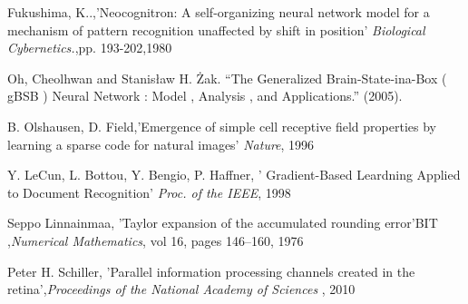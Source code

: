 \documentclass[journal]{IEEEtai}
\begin{document}
\begin{thebibliography}{34}
 Fukushima, K..,'Neocognitron: A self-organizing neural network model for a mechanism of pattern recognition unaffected by shift in position' {\em Biological Cybernetics.},pp. 193-202,1980







 Oh, Cheolhwan and Stanisław H. Żak. “The Generalized Brain-State-ina-Box ( gBSB ) Neural Network : Model , Analysis , and Applications.” (2005).

 B. Olshausen, D. Field,'Emergence of simple cell receptive field properties by learning a sparse code for natural images' {\em Nature}, 1996 

 Y. LeCun, L. Bottou, Y. Bengio, P. Haffner, ' Gradient-Based Leardning Applied to Document Recognition' {\em Proc. of the IEEE}, 1998





 Seppo Linnainmaa, 'Taylor expansion of the accumulated rounding error'BIT ,{\em  Numerical Mathematics}, vol 16, pages 146–160, 1976

 Peter H. Schiller, 'Parallel information processing channels created in the retina',{\em Proceedings of the National Academy of Sciences }, 2010


\end{thebibliography}
\end{document}
